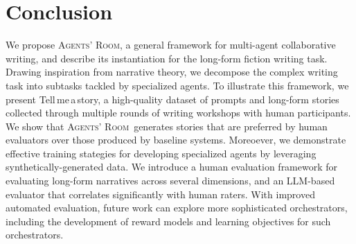 \documentclass{article}
\newcommand{\Agentsroom}{\textsc{Agents' Room}}
\newcommand{\tellmeastory}{{\sc Tell$\,$me$\,$a$\,$story}}
\newcommand{\reinald}[1]{{\textcolor{teal}{\bf{Reinald:} \emph{#1}}}}
\begin{document}




\section{Conclusion} 
We propose \Agentsroom, a general framework for multi-agent collaborative writing, and describe its instantiation for the long-form fiction writing task. Drawing inspiration from narrative theory, we  decompose the complex writing task into subtasks tackled by specialized agents. To illustrate this framework, we present \tellmeastory, a high-quality dataset of prompts and long-form stories collected through multiple rounds of writing workshops with human participants. We show that \Agentsroom\ generates stories that are preferred by human evaluators over those produced by baseline systems. Moreoever, we demonstrate effective training stategies for developing specialized agents by leveraging  synthetically-generated data. We introduce a human evaluation framework for evaluating long-form narratives across several dimensions, and an LLM-based evaluator that correlates significantly with human raters. With improved automated evaluation, future work can explore more sophisticated orchestrators, including the development of reward models and learning objectives for such orchestrators.

 
\end{document}
